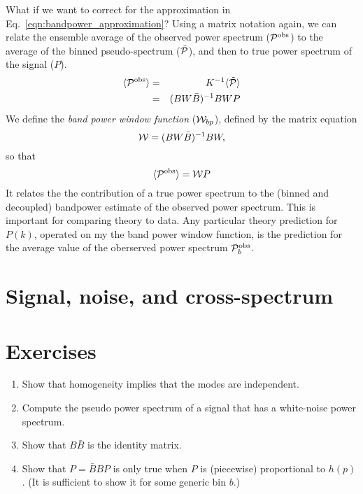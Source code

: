 What if we want to correct for the approximation in Eq.~\ref{eqn:bandpower_approximation}?  
Using a matrix notation again, we can relate the ensemble average of the observed power spectrum (${\cal P}^{\rm obs}$) to the average of the binned pseudo-spectrum ($\tilde {\cal P}$), and then to true power spectrum of the signal ($P$).
\begin{eqnarray}
  \langle {\cal P}^{\rm obs} \rangle &=& K^{-1} \langle \tilde {\cal P} \rangle \\
  &=&  (B W \bar B)^{-1} B W P \\
\end{eqnarray}
We define the \textit{band power window function} (${\cal W}_{bp}$), defined by the matrix equation
\begin{equation}
  {\cal W} = (B W \bar B)^{-1} B W,
\end{equation}
 so that
\begin{equation}
  \langle {\cal P}^{\rm obs} \rangle = {\cal W} P
\end{equation}
It relates the the contribution of a true power spectrum to the (binned and decoupled) bandpower estimate of the observed power spectrum.  This is important for comparing theory to data.  Any particular theory prediction for $P(k)$, operated on my the band power window function, is the prediction for the average value of the oberserved power spectrum ${\cal P}^{\rm obs}_b$.

\section{Signal, noise, and cross-spectrum}

\nocite{numerical_recipes,master,namaster}


\section*{Exercises}

\begin{enumerate}

\item Show that homogeneity implies that the modes are independent.

\item Compute the pseudo power spectrum of a signal that has a white-noise power spectrum.

\item Show that $B\bar B$ is the identity matrix.

\item Show that $P = \bar B B P$ is only true when $P$ is (piecewise) proportional to $h(p)$.  (It is sufficient to show it for some generic bin $b$.)
  
\end{enumerate}


